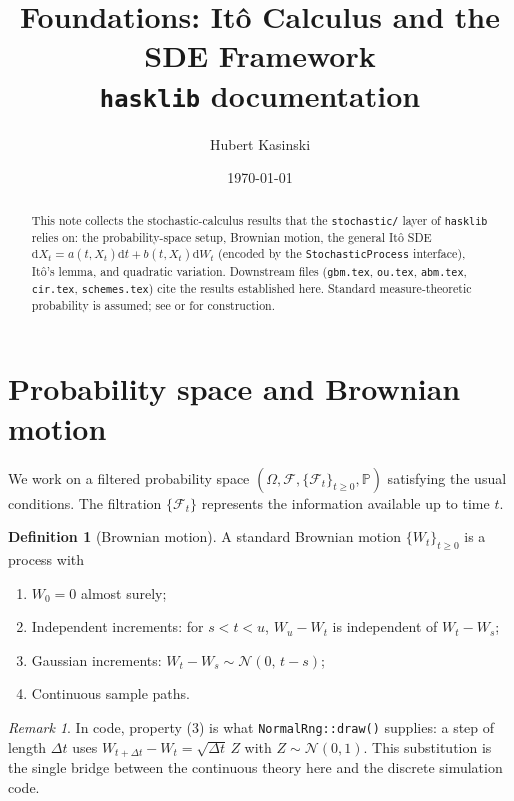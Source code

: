 \documentclass[11pt]{article}
\title{Foundations: It\^o Calculus and the SDE Framework\\
       \large \texttt{hasklib} documentation}
\author{Hubert Kasinski}
\date{\today}
\newcommand{\Prob}{\mathbb{P}}          %
\newcommand{\filt}{\mathcal{F}}        %
\newcommand{\Om}{\Omega}               %
\newcommand{\dd}{\mathrm{d}}           %
\newcommand{\dW}{\dd W_t}              %
\newcommand{\dt}{\dd t}                %
\newcommand{\drift}{a}                 %
\newcommand{\diff}{b}                  %
\theoremstyle{plain}
\theoremstyle{definition}
\newtheorem{definition}{Definition}
\theoremstyle{remark}
\newtheorem{remark}{Remark}
\begin{document}
\maketitle

\begin{abstract}
This note collects the stochastic-calculus results that the
\texttt{stochastic/} layer of \texttt{hasklib} relies on: the
probability-space setup, Brownian motion, the general It\^o SDE
$\dd X_t = \drift(t,X_t)\dt + \diff(t,X_t)\dW$ (encoded by the
\texttt{StochasticProcess} interface), It\^o's lemma, and quadratic
variation. Downstream files (\texttt{gbm.tex}, \texttt{ou.tex},
\texttt{abm.tex}, \texttt{cir.tex}, \texttt{schemes.tex}) cite the results established
here. Standard measure-theoretic probability is assumed; see
 or  for construction.
\end{abstract}

\section{Probability space and Brownian motion}

We work on a filtered probability space
$(\Om, \filt, \{\filt_t\}_{t\ge 0}, \Prob)$ satisfying the usual
conditions. The filtration $\{\filt_t\}$ represents the information
available up to time $t$.

\begin{definition}[Brownian motion]
A standard Brownian motion $\{W_t\}_{t\ge 0}$ is a process with
\begin{enumerate}
  \item $W_0 = 0$ almost surely;
  \item Independent increments: for $s < t < u $, $W_u - W_t$ is
        independent of $W_t - W_s$;
  \item Gaussian increments: $W_t - W_s \sim \mathcal{N}(0,\, t-s)$;
  \item Continuous sample paths.
\end{enumerate}
\end{definition}

\begin{remark}
In code, property (3) is what \texttt{NormalRng::draw()} supplies:
a step of length $\Delta t$ uses $W_{t+\Delta t}-W_t = \sqrt{\Delta t}\,Z$
with $Z\sim\mathcal N(0,1)$. This substitution is the single bridge
between the continuous theory here and the discrete simulation code.
\\
\end{remark}
\end{document}

